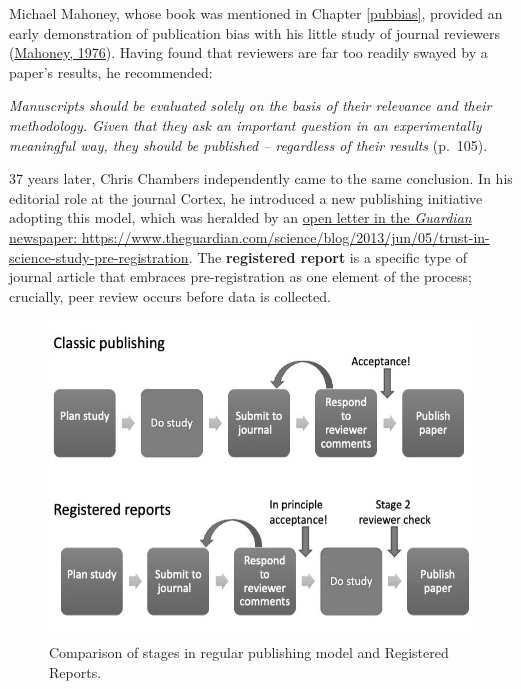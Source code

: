 \documentclass{krantz}
\begin{document}
Michael Mahoney, whose book was mentioned in Chapter \ref{pubbias}, provided an early demonstration of publication bias with his little study of journal reviewers (\protect\hyperlink{ref-mahoney1976}{Mahoney, 1976}). Having found that reviewers are far too readily swayed by a paper's results, he recommended:

\emph{Manuscripts should be evaluated solely on the basis of their relevance and their methodology. Given that they ask an important question in an experimentally meaningful way, they should be published -- regardless of their results} (p.~105).

37 years later, Chris Chambers independently came to the same conclusion. In his editorial role at the journal Cortex, he introduced a new publishing initiative adopting this model, which was heralded by an \href{https://www.theguardian.com/science/blog/2013/jun/05/trust-in-science-study-pre-registration}{open letter in the \textit{Guardian} newspaper: https://www.theguardian.com/science/blog/2013/jun/05/trust-in-science-study-pre-registration}. The \textbf{registered report} is a specific type of journal article that embraces pre-registration as one element of the process; crucially, peer review occurs before data is collected.

\begin{figure}

{\centering \includegraphics[width=0.75\linewidth]{images_bw/RR_compare_regularpublishing} 

}

\caption{Comparison of stages in regular publishing model and Registered Reports.}\label{fig:RRcompare}
\end{figure}
\end{document}
